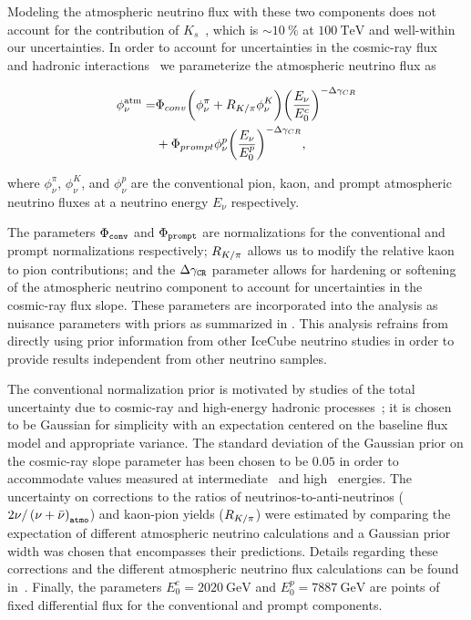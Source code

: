 Modeling the atmospheric neutrino flux with these two components does not account for the contribution of $K_s$~\cite{Gaisser:2014pda}, which is $\sim \SI{10}\percent$ at $\SI{100}\TeV$ and well-within our uncertainties.
In order to account for uncertainties in the cosmic-ray flux~\cite{Dembinski:2017zsh} and hadronic interactions~\cite{Fedynitch:2012fs} we parameterize the atmospheric neutrino flux as
\noindent
\begin{linenomath*}
	\begin{equation}
	\begin{split}
	\phi_\nu^{\rm{atm}} =& \Phi_{conv} \bigg(\phi^\pi_\nu + R_{K/\pi} \phi^K_\nu\bigg) {\bigg(\frac{E_\nu}{E_0^c} \bigg)}^{-\Delta \gamma_{CR}} \\ &+ \Phi_{prompt} \phi^p_\nu {\bigg(\frac{E_\nu}{E_0^p} \bigg)}^{-\Delta \gamma_{CR}},
	\end{split}
	\label{eq:atm_flux_equation}
	\end{equation}
\end{linenomath*}
where $\phi^\pi_\nu$, $\phi^K_\nu$, and $\phi^p_\nu$ are the conventional pion, kaon, and prompt atmospheric neutrino fluxes at a neutrino energy $E_\nu$ respectively.

The parameters $\Phi_\texttt{conv}$ and $\Phi_\texttt{prompt}$ are normalizations for the conventional and prompt normalizations respectively; $R_{K/\pi}$ allows us to modify the relative kaon to pion contributions; and the $\Delta\gamma_\texttt{CR}$ parameter allows for hardening or softening of the atmospheric neutrino component to account for uncertainties in the cosmic-ray flux slope.
These parameters are incorporated into the analysis as nuisance parameters with priors as summarized in .
This analysis refrains from directly using prior information from other IceCube neutrino studies in order to provide results independent from other neutrino samples.

The conventional normalization prior is motivated by studies of the total uncertainty due to cosmic-ray and high-energy hadronic processes~\cite{Fedynitch:2012fs}; it is chosen to be Gaussian for simplicity with an expectation centered on the baseline flux model and appropriate variance.
The standard deviation of the Gaussian prior on the cosmic-ray slope parameter has been chosen to be $0.05$ in order to accommodate values measured at intermediate~\cite{Karelin:2011zz} and high~\cite{Bartoli:2015fhw,Yoon:2017qjx,Alfaro:2017cwx} energies.
The uncertainty on corrections to the ratios of neutrinos-to-anti-neutrinos (${2\nu/\left(\nu+\bar{\nu}\right)}_\texttt{atmo}$) and kaon-pion yields ($R_{K/\pi}$) were estimated by comparing the expectation of different atmospheric neutrino calculations and a Gaussian prior width was chosen that encompasses their predictions.
Details regarding these corrections and the different atmospheric neutrino flux calculations can be found in~\cite{CollinFluxes,Jones:2015bya}.
Finally, the parameters $E_0^c=\SI{2020}\GeV$ and $E_0^p=\SI{7887}\GeV$ are points of fixed differential flux for the conventional and prompt components.

